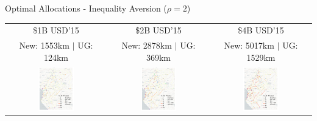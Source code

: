 \documentclass[aspectratio=169,xcolor=dvipsnames]{beamer}
\begin{document}
\begin{frame}{Optimal Allocations - Inequality Aversion ($\rho = 2$)}
\vspace{-1mm}
\begin{adjustbox}{center}
\begin{tabular}{@{}c@{}|@{}c@{}|@{}c@{}} 
\$1B USD'15 & \$2B USD'15 & \$4B USD'15 \\
New: 1553km $|$ UG: 124km & New: 2878km $|$ UG: 369km & New: 5017km $|$ UG: 1529km \\ 
\includegraphics[width=0.38\textwidth, trim= {0.9cm 0 0.9cm 0}, clip]{"../figures/GE/trans_africa_network_GE_add_20g_1b_fixed_cgc_sigma3.8_rho2_julia_MACR_90kmh_google_perc_ug.pdf"} & 
\includegraphics[width=0.38\textwidth, trim= {0.9cm 0 0.9cm 0}, clip]{"../figures/GE/trans_africa_network_GE_add_20g_2b_fixed_cgc_sigma3.8_rho2_julia_MACR_90kmh_google_perc_ug.pdf"} &
\includegraphics[width=0.38\textwidth, trim= {0.9cm 0 0.9cm 0}, clip]{"../figures/GE/trans_africa_network_GE_add_20g_4b_fixed_cgc_sigma3.8_rho2_julia_MACR_90kmh_google_perc_ug.pdf"}  
\end{tabular}
\end{adjustbox}
\end{frame}
\end{document}
